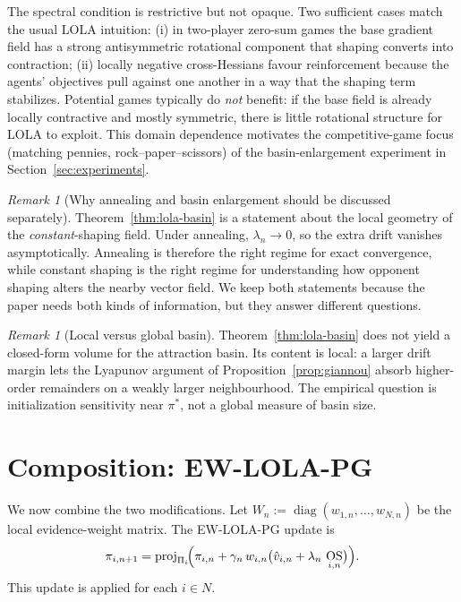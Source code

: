 \documentclass{article}
\theoremstyle{plain}
\theoremstyle{definition}
\theoremstyle{remark}
\newtheorem{remark}[theorem]{Remark}
\newcommand{\proj}{\operatorname{proj}}
\DeclareMathOperator{\diag}{diag}
\DeclareMathOperator{\OS}{OS}
\begin{document}
The spectral condition is restrictive but not opaque. Two sufficient cases match the usual LOLA intuition: (i) in two-player zero-sum games the base gradient field has a strong antisymmetric rotational component that shaping converts into contraction; (ii) locally negative cross-Hessians favour reinforcement because the agents' objectives pull against one another in a way that the shaping term stabilizes. Potential games typically do \emph{not} benefit: if the base field is already locally contractive and mostly symmetric, there is little rotational structure for LOLA to exploit. This domain dependence motivates the competitive-game focus (matching pennies, rock--paper--scissors) of the basin-enlargement experiment in Section~\ref{sec:experiments}.

\begin{remark}[Why annealing and basin enlargement should be discussed separately]
Theorem~\ref{thm:lola-basin} is a statement about the local geometry of the \emph{constant}-shaping field. Under annealing, $\lambda_n\to 0$, so the extra drift vanishes asymptotically. Annealing is therefore the right regime for exact convergence, while constant shaping is the right regime for understanding how opponent shaping alters the nearby vector field. We keep both statements because the paper needs both kinds of information, but they answer different questions.
\end{remark}

\begin{remark}[Local versus global basin]
Theorem~\ref{thm:lola-basin} does not yield a closed-form volume for the attraction basin. Its content is local: a larger drift margin lets the Lyapunov argument of Proposition~\ref{prop:giannou} absorb higher-order remainders on a weakly larger neighbourhood. The empirical question is initialization sensitivity near $\pi^\ast$, not a global measure of basin size.
\end{remark}

\section{Composition: EW-LOLA-PG}\label{sec:composition}

We now combine the two modifications. Let
\(
W_n := \diag(w_{1,n},\ldots,w_{N,n})
\)
be the local evidence-weight matrix. The EW-LOLA-PG update is
\begin{equation}\label{eq:ewlola-update}
\pi_{i,n+1}
=
\proj_{\Pi_i}\!\Bigl(
\pi_{i,n}
+ \gamma_n\,w_{i,n}\bigl(\hat v_{i,n}+\lambda_n\,\OS_{i,n}\bigr)
\Bigr).
\end{equation}
This update is applied for each $i\in N$.
\end{document}
